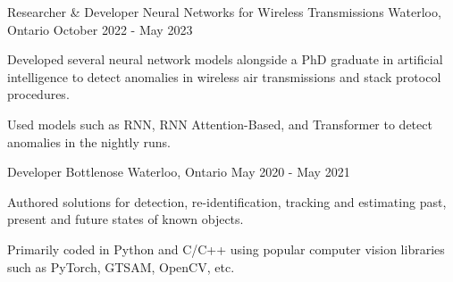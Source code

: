 
\begin{cventries}
  \cventry
    {Researcher \& Developer} %
    {Neural Networks for Wireless Transmissions} %
    {Waterloo, Ontario} %
    {October 2022 - May 2023} %
    {
      \begin{cvitems} %
        \item {Developed several neural network models alongside a PhD graduate in artificial intelligence to detect anomalies in wireless air transmissions and stack protocol procedures.}
        \item {Used models such as RNN, RNN Attention-Based, and Transformer to detect anomalies in the nightly runs.}
      \end{cvitems}
    }

  \cventry
    {Developer} %
    {Bottlenose} %
    {Waterloo, Ontario} %
    {May 2020 - May 2021} %
    {
      \begin{cvitems} %
        \item {Authored solutions for detection, re-identification, tracking and estimating past, present and future states of known objects.}
        \item {Primarily coded in Python and C/C++ using popular computer vision libraries such as PyTorch, GTSAM, OpenCV, etc.}
      \end{cvitems}
    }



\end{cventries}
